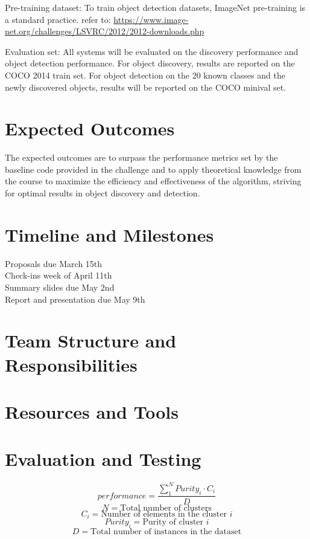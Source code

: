 \documentclass{article}
\begin{document}
	Pre-training dataset: To train object detection datasets, ImageNet pre-training is a standard practice. refer to: \url{https://www.image-net.org/challenges/LSVRC/2012/2012-downloads.php}
	
	Evaluation set: All systems will be evaluated on the discovery performance and object detection performance. For object discovery, results are reported on the COCO 2014 train set. For object detection on the 20 known classes and the newly discovered objects, results will be reported on the COCO minival set.
	
	
	\section{Expected Outcomes}
	
	
	The expected outcomes are to surpass the performance metrics set by the baseline code provided in the challenge and to apply theoretical knowledge from the course to maximize the efficiency and effectiveness of the algorithm, striving for optimal results in object discovery and detection.
	
	
	\section{Timeline and Milestones}
	Proposals due March 15th\\
	Check-ins week of April 11th\\
	Summary slides due May 2nd\\
	Report and presentation due May 9th\\
	
	\section{Team Structure and Responsibilities}
	
	\section{Resources and Tools}
	
	\section{Evaluation and Testing}
	$$performance = \frac{\sum_{1}^{N}Purity_{i} \cdot C_{i}}{D}$$
	$$N = \textrm{Total number of clusters}$$
	$$C_{i} = \textrm{Number of elements in the cluster } i$$
	$$Purity_{i} = \textrm{Purity of cluster } i$$
	$$D = \textrm{Total number of instances in the dataset}$$
	
\end{document}
